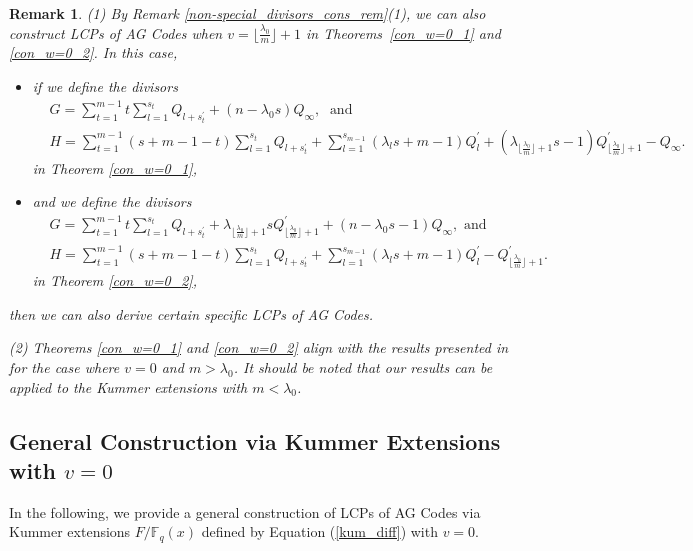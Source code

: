 \documentclass[journal,12pt,onecolumn]{IEEEtran}
\newtheorem{remark}[theorem]{Remark}
\begin{document}
\begin{remark}\label{con_w=0_rem}
    {\rm (1)} By Remark \ref{non-special_divisors_cons_rem}(1), we can also construct LCPs of AG Codes when $v=\big\lfloor\frac{\lambda_0}{m}\big\rfloor+1$ in Theorems~\ref{con_w=0_1} and \ref{con_w=0_2}. In this case, 
    \begin{itemize}
        \item if we define the divisors
        \begin{align*}
        & G = \sum_{t=1}^{m-1}t\sum_{l=1}^{s_t}Q_{l+s_t^\prime} + (n-\lambda_0s)Q_\infty,\;\text{ and }\\
        & H = \sum_{t=1}^{m-1}(s+m-1-t)\sum_{l=1}^{s_t}Q_{l+s_t^\prime} + \sum_{l=1}^{s_{m-1}}(\lambda_{l} s+m-1)Q^\prime_{l} + (\lambda_{\lfloor\frac{\lambda_0}{m}\rfloor+1}s-1)Q^\prime_{\lfloor\frac{\lambda_0}{m}\rfloor+1} - Q_\infty. 
    \end{align*}
    in Theorem \ref{con_w=0_1},
    \item and we define the divisors
    \begin{align*}
        & G = \sum_{t=1}^{m-1}t\sum_{l=1}^{s_t}Q_{l+s_t^\prime} + \lambda_{\lfloor\frac{\lambda_0}{m}\rfloor+1}sQ^\prime_{\lfloor\frac{\lambda_0}{m}\rfloor+1} +  (n-\lambda_0s-1)Q_\infty,\text{ and }\\
        & H = \sum_{t=1}^{m-1}(s+m-1-t)\sum_{l=1}^{s_t}Q_{l+s_t^\prime}+ \sum_{l=1}^{s_{m-1}}(\lambda_{l} s+m-1)Q^\prime_{l} -Q^\prime_{\lfloor\frac{\lambda_0}{m}\rfloor+1}. 
    \end{align*}
    in Theorem \ref{con_w=0_2},
    \end{itemize}
    then we can also derive certain specific LCPs of AG Codes. 

    {\rm (2)} Theorems \ref{con_w=0_1} and \ref{con_w=0_2} align with the results presented in \cite{Linear_Complementary_Dual_codes_and_Linear_Complementary_Pairs_of_AG_codes_in_function_fields} for the case where $v=0$ and $m>\lambda_0$. It should be noted that our results can be applied to the Kummer extensions with $m<\lambda_0$. 
\end{remark}


\subsection{General Construction via Kummer Extensions with $v=0$}

In the following, we provide a general construction of LCPs of AG Codes via Kummer extensions $F/\mathbb{F}_q(x)$ defined by Equation (\ref{kum_diff}) with $v=0$.
\end{document}
